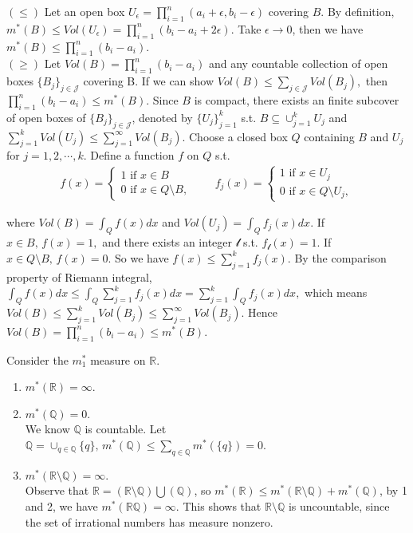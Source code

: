 \begin{pfbox}
    $(\le)$ Let an open box $U_\epsilon = \prod_{i=1}^{n}(a_i+\epsilon, b_i-\epsilon)$ covering $B$. By definition, $m^*(B)\le Vol(U_\epsilon)=\prod_{i=1}^{n}(b_i-a_i+2\epsilon).$ Take $\epsilon\to 0$, then we have $m^*(B)\le \prod_{i=1}^{n}(b_i-a_i).$\\
    
    $(\ge)$ Let $Vol(B)=\prod_{i=1}^{n}(b_i-a_i)$ and any countable collection of open boxes $\{B_j\}_{j\in\mathcal{J}}$ covering B. If we can show $Vol(B)\le\sum_{j\in\mathcal{J}}Vol(B_j),$ then $\prod_{i=1}^{n}(b_i-a_i)\le m^*(B).$
    Since $B$ is compact, there exists an finite subcover of open boxes of $\{B_j\}_{j\in\mathcal{J}}$, denoted by $\{U_j\}_{j=1}^{k}$ s.t.
    $B\subseteq\cup_{j=1}^{k}U_j$ and $\sum_{j=1}^{k}Vol(U_j)\le\sum_{j=1}^{\infty}Vol(B_j)$.
    Choose a closed box $Q$ containing $B$ and $U_j$ for $j=1,2,\cdots,k.$
    Define a function $f$ on $Q$ s.t.
    \[\begin{aligned}
        f(x)=\begin{cases}
            1 \text{ if } x\in B\\
            0 \text{ if } x\in Q\setminus B,
        \end{cases}\qquad
        f_j(x)=\begin{cases}
            1 \text{ if } x\in U_j\\
            0 \text{ if } x\in Q\setminus U_j,
        \end{cases}
    \end{aligned}\]

    where $Vol(B)=\int_Q f(x)dx$ and $Vol(U_j)=\int_Qf_j(x)dx$.
    If $x\in B,\, f(x)=1,$ and there exists an integer $\mathscr{l}$ s.t. $f_\mathscr{l}(x)=1.$
    If $x\in Q\setminus B,\,f(x)=0.$ 
    So we have $f(x)\le\sum_{j=1}^{k}f_j(x).$ By the comparison property of Riemann integral,
    $\int_Qf(x)dx\le\int_Q\sum_{j=1}^{k}f_j(x)dx = \sum_{j=1}^{k}\int_Q f_j(x)dx,$ which means
    $Vol(B)\le \sum_{j=1}^{k}Vol(B_j)\le \sum_{j=1}^{\infty}Vol(B_j)$.
    Hence $Vol(B)= \prod_{i=1}^{n}(b_i-a_i)\le m^*(B).$
\end{pfbox}

\begin{example}
Consider the $m^*_1$ measure on $\mathbb{R}$.
\begin{enumerate}
    \item $m^*(\mathbb{R})=\infty.$
    \item $m^*(\mathbb{Q})=0.$\\
    We know $\mathbb{Q}$ is countable. Let $\mathbb{Q}=\cup_{q\in\mathbb{Q}}\{q\},\,m^*(\mathbb{Q})\le\sum_{q\in\mathbb{Q}}m^*(\{q\})=0.$
    \item $m^*(\mathbb{R}\setminus\mathbb{Q})=\infty.$\\
    Observe that $\mathbb{R}=(\mathbb{R}\setminus\mathbb{Q})\bigcup(\mathbb{Q})$,
    so $m^*(\mathbb{R})\le m^*(\mathbb{R}\setminus\mathbb{Q})+m^*(\mathbb{Q})$, by 1 and 2, we have $m^*(\mathbb{R}\mathbb{Q})=\infty.$ 
    This shows that $\mathbb{R}\setminus\mathbb{Q}$ is uncountable, since the set of irrational numbers has measure nonzero.
\end{enumerate}
\end{example}

